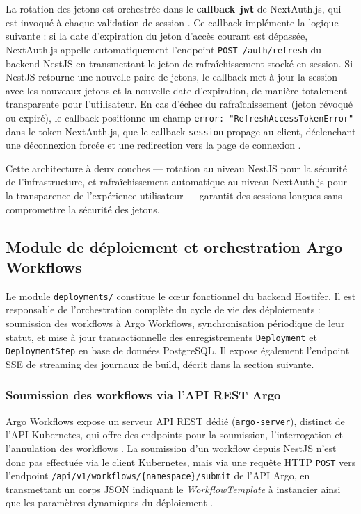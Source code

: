 La rotation des jetons est orchestrée dans le \textbf{callback \texttt{jwt}} de NextAuth.js, qui est invoqué à chaque validation de session \cite{authjs-refresh}. Ce callback implémente la logique suivante : si la date d'expiration du jeton d'accès courant est dépassée, NextAuth.js appelle automatiquement l'endpoint \texttt{POST /auth/refresh} du backend NestJS en transmettant le jeton de rafraîchissement stocké en session. Si NestJS retourne une nouvelle paire de jetons, le callback met à jour la session avec les nouveaux jetons et la nouvelle date d'expiration, de manière totalement transparente pour l'utilisateur. En cas d'échec du rafraîchissement (jeton révoqué ou expiré), le callback positionne un champ \texttt{error: "RefreshAccessTokenError"} dans le token NextAuth.js, que le callback \texttt{session} propage au client, déclenchant une déconnexion forcée et une redirection vers la page de connexion \cite{nextauth-refresh-discussion}.

Cette architecture à deux couches — rotation au niveau NestJS pour la sécurité de l'infrastructure, et rafraîchissement automatique au niveau NextAuth.js pour la transparence de l'expérience utilisateur — garantit des sessions longues sans compromettre la sécurité des jetons.


\subsection{Module de déploiement et orchestration Argo Workflows}

Le module \texttt{deployments/} constitue le cœur fonctionnel du backend Hostifer. Il est responsable de l'orchestration complète du cycle de vie des déploiements : soumission des workflows à Argo Workflows, synchronisation périodique de leur statut, et mise à jour transactionnelle des enregistrements \texttt{Deployment} et \texttt{DeploymentStep} en base de données PostgreSQL. Il expose également l'endpoint SSE de streaming des journaux de build, décrit dans la section suivante.

\subsubsection*{Soumission des workflows via l'API REST Argo}

Argo Workflows expose un serveur API REST dédié (\texttt{argo-server}), distinct de l'API Kubernetes, qui offre des endpoints pour la soumission, l'interrogation et l'annulation des workflows \cite{argo-rest-api}. La soumission d'un workflow depuis NestJS n'est donc pas effectuée via le client Kubernetes, mais via une requête HTTP \texttt{POST} vers l'endpoint \texttt{/api/v1/workflows/\{namespace\}/submit} de l'API Argo, en transmettant un corps JSON indiquant le \textit{WorkflowTemplate} à instancier ainsi que les paramètres dynamiques du déploiement \cite{argo-submit-example}.

